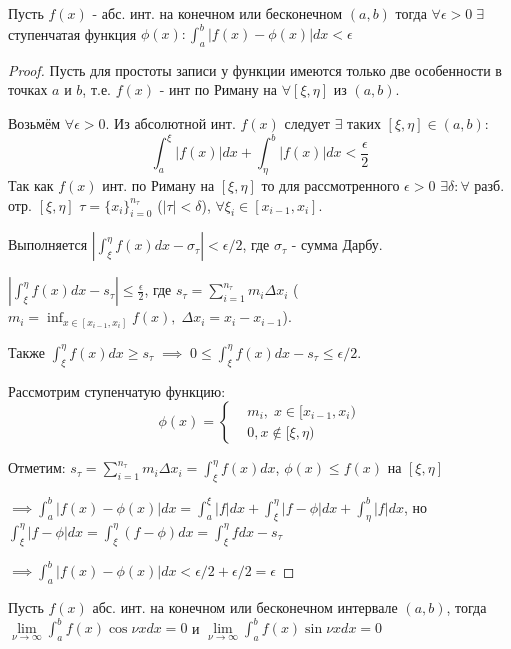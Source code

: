 \documentclass{article}
\begin{document}
\begin{theorem}
  Пусть $f(x)$ - абс. инт. на конечном или бесконечном $(a,b)$ тогда
  $\forall \epsilon >0 \; \exists$ ступенчатая функция $\phi(x):\int_{a}^{b}|f(x)-\phi(x)|dx<\epsilon$
\end{theorem}
\begin{proof}
  Пусть для простоты записи у функции имеются только две особенности в точках $a$ и $b$,
  т.е. $f(x)$ - инт по Риману на $\forall [\xi,\eta]$ из $(a,b)$. 

  Возьмём $\forall \epsilon>0$. Из абсолютной инт. $f(x)$ следует $\exists$ таких
  $[\xi,\eta] \in (a,b)$:
  \[
    \int_{a}^{\xi}|f(x)|dx+\int_{\eta}^{b}|f(x)|dx< \frac{\epsilon}{2}
  \]
  Так как $f(x)$ инт. по Риману на $[\xi,\eta]$ то для рассмотренного $\epsilon>0$ 
  $\exists \delta:\forall$ разб. отр. $[\xi, \eta]$ $\tau=\{x_i\}_{i=0}^{n_\tau}$
  ($|\tau|<\delta$), $\forall \xi_i \in [x_{i-1}, x_i]$.

  Выполняется $\left|\int_{\xi}^{\eta}f(x)dx-\sigma_\tau\right|<\epsilon/2$, где
  $\sigma_\tau$ - сумма Дарбу. 

  $ \left|\int_{\xi}^{\eta}f(x)dx - s_\tau\right|\le \frac{\epsilon}{2}$,
  где $s_\tau=\sum_{i=1}^{n_\tau}m_i\Delta x_i$ ($m_i=\inf_{x \in [x_{i-1},x_i]} f(x), \; \Delta x_i=x_i-x_{i-1}$).

  Также $\int_{\xi}^{\eta}f(x)dx\ge s_\tau \; \implies \; 0 \le \int_{\xi}^{\eta}f(x)dx - s_\tau \le \epsilon/2$.

  Рассмотрим ступенчатую функцию:
  \[
    \phi(x) = \left\{\begin{aligned}
       & m_i, \; x \in [x_{i-1}, x_i) \\ 
       & 0, x \notin [\xi,\eta)
    \end{aligned}\right.
  \]

  Отметим: $s_\tau=\sum_{i=1}^{n_\tau}m_i\Delta x_i=\int_{\xi}^{\eta}f(x)dx$, $\phi(x)\le f(x)$ на $[\xi,\eta]$

  $\implies \int_{a}^{b}|f(x)-\phi(x)|dx=\int_{a}^{\xi}|f|dx+\int_{\xi}^{\eta}|f-\phi|dx+\int_{\eta}^{b}|f|dx$,
  но $\int_{\xi}^{\eta}|f-\phi|dx=\int_{\xi}^{\eta}(f-\phi)dx=\int_{\xi}^{\eta}fdx-s_\tau$

  $\implies \int_{a}^{b}|f(x)-\phi(x)|dx<\epsilon/2+\epsilon/2=\epsilon$
\end{proof}
\begin{theorem}
  Пусть $f(x)$ абс. инт. на конечном или бесконечном интервале $(a,b)$,
  тогда $\lim\limits_{\nu\to\infty}\int_{a}^{b}f(x)\cos\nu xdx=0$ и
  $\lim\limits_{\nu\to\infty}\int_{a}^{b}f(x)\sin\nu xdx=0$
\end{theorem}
\end{document}
